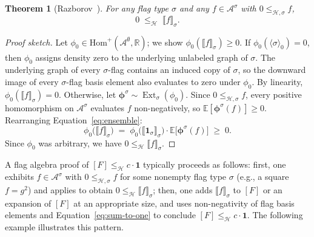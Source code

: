 \documentclass{article}
\newtheorem{theorem}{Theorem}[section]
\newcommand{\poshom}[1]{\mathrm{Hom}^+(\mathcal{A}^{#1}, \mathbb{R})}
\newcommand{\Ext}{\operatorname{Ext}}
\begin{document}
\begin{theorem}[Razborov~{\cite{razborov2007flag}}]\label{thm:downward-nonneg}
  For any flag type $\sigma$ and any $f \in \mathcal{A}^\sigma$ with $0 \leq_{\mathcal{H},\sigma} f$,
  \[
    0 \;\leq_{\mathcal{H}}\; \llbracket f \rrbracket_\sigma.
  \]
\end{theorem}
\begin{proof}[Proof sketch]
  Let $\phi_0 \in \poshom{\emptyset}$; we show $\phi_0(\llbracket f \rrbracket_\sigma) \geq 0$.
  If $\phi_0(\langle\sigma\rangle_0) = 0$, then $\phi_0$ assigns density zero
  to the underlying unlabeled graph of $\sigma$.  The underlying graph of
  every $\sigma$-flag contains an induced copy of $\sigma$, so the downward
  image of every $\sigma$-flag basis element also evaluates to zero under
  $\phi_0$.  By linearity, $\phi_0(\llbracket f \rrbracket_\sigma) = 0$.
  Otherwise, let $\boldsymbol{\phi}^\sigma \sim \Ext_\sigma(\phi_0)$.
  Since $0 \leq_{\mathcal{H},\sigma} f$, every positive homomorphism on
  $\mathcal{A}^\sigma$ evaluates $f$ non-negatively, so
  $\mathbb{E}[\boldsymbol{\phi}^\sigma(f)] \geq 0$.
  Rearranging Equation~\eqref{eq:ensemble}:
  \[
    \phi_0\bigl(\llbracket f \rrbracket_\sigma\bigr)
    \;=\;
    \phi_0\bigl(\llbracket \mathbf{1}_\sigma \rrbracket_\sigma\bigr)
    \cdot
    \mathbb{E}\bigl[\boldsymbol{\phi}^\sigma(f)\bigr]
    \;\geq\; 0.
  \]
  Since $\phi_0$ was arbitrary, we have $0 \leq_{\mathcal{H}} \llbracket f \rrbracket_\sigma$.
\end{proof}

A flag algebra proof of $[F] \leq_{\mathcal{H}} c\cdot\mathbf{1}$ typically proceeds as follows:
first, one exhibits $f \in \mathcal{A}^\sigma$ with $0 \leq_{\mathcal{H},\sigma} f$ for some
nonempty flag type $\sigma$ (e.g., a square $f = g^2$) and applies
 to obtain $0 \leq_{\mathcal{H}} \llbracket f \rrbracket_\sigma$;
then, one adds $\llbracket f \rrbracket_\sigma$ to $[F]$ or an expansion of $[F]$
at an appropriate size, and uses non-negativity of flag basis elements and
Equation~\eqref{eq:sum-to-one} to conclude $[F] \leq_{\mathcal{H}} c\cdot\mathbf{1}$.
The following example illustrates this pattern.
\end{document}
